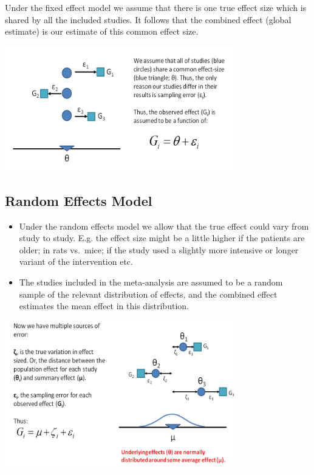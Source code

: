 \documentclass[
]{book}
\providecommand{\tightlist}{%
  \setlength{\itemsep}{0pt}\setlength{\parskip}{0pt}}
\begin{document}
Under the fixed effect model we assume that there is one true effect size which is shared by all the included studies. It follows that the combined effect (global estimate) is our estimate of this common effect size.

\includegraphics[width=0.75\textwidth,height=\textheight]{figs/fixedeffects.png}

\hypertarget{random-effects-model}{%
\subsection{Random Effects Model}\label{random-effects-model}}

\begin{itemize}
\tightlist
\item
  Under the random effects model we allow that the true effect could vary from study to study. E.g. the effect size might be a little higher if the patients are older; in rats vs.~mice; if the study used a slightly more intensive or longer variant of the intervention etc.
\item
  The studies included in the meta-analysis are assumed to be a random sample of the relevant distribution of effects, and the combined effect estimates the mean effect in this distribution.
\end{itemize}

\includegraphics[width=0.75\textwidth,height=\textheight]{figs/randomeffects.png}
\end{document}
